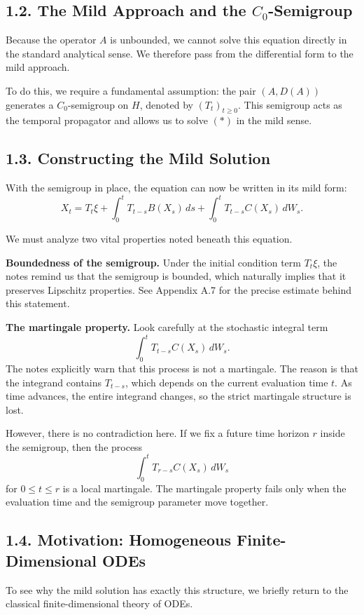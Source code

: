 \documentclass[11pt]{article}
\theoremstyle{definition}
\theoremstyle{remark}
\begin{document}
\subsection*{1.2. The Mild Approach and the \(C_0\)-Semigroup}
Because the operator \(A\) is unbounded, we cannot solve this equation directly in the standard analytical sense. We therefore pass from the differential form to the mild approach.

To do this, we require a fundamental assumption: the pair \((A,D(A))\) generates a \(C_0\)-semigroup on \(H\), denoted by \((T_t)_{t\ge 0}\). This semigroup acts as the temporal propagator and allows us to solve \((*)\) in the mild sense.

\subsection*{1.3. Constructing the Mild Solution}
With the semigroup in place, the equation can now be written in its mild form:
\[
X_t
=
T_t\xi+\int_0^t T_{t-s}B(X_s)\,ds+\int_0^t T_{t-s}C(X_s)\,dW_s.
\]

We must analyze two vital properties noted beneath this equation.

\textbf{Boundedness of the semigroup.} Under the initial condition term \(T_t\xi\), the notes remind us that the semigroup is bounded, which naturally implies that it preserves Lipschitz properties. See Appendix A.7 for the precise estimate behind this statement.

\textbf{The martingale property.} Look carefully at the stochastic integral term
\[
\int_0^t T_{t-s}C(X_s)\,dW_s.
\]
The notes explicitly warn that this process is not a martingale. The reason is that the integrand contains \(T_{t-s}\), which depends on the current evaluation time \(t\). As time advances, the entire integrand changes, so the strict martingale structure is lost.

However, there is no contradiction here. If we fix a future time horizon \(r\) inside the semigroup, then the process
\[
\int_0^t T_{r-s}C(X_s)\,dW_s
\]
for \(0\le t\le r\) is a local martingale. The martingale property fails only when the evaluation time and the semigroup parameter move together.

\subsection*{1.4. Motivation: Homogeneous Finite-Dimensional ODEs}
To see why the mild solution has exactly this structure, we briefly return to the classical finite-dimensional theory of ODEs.
\end{document}
